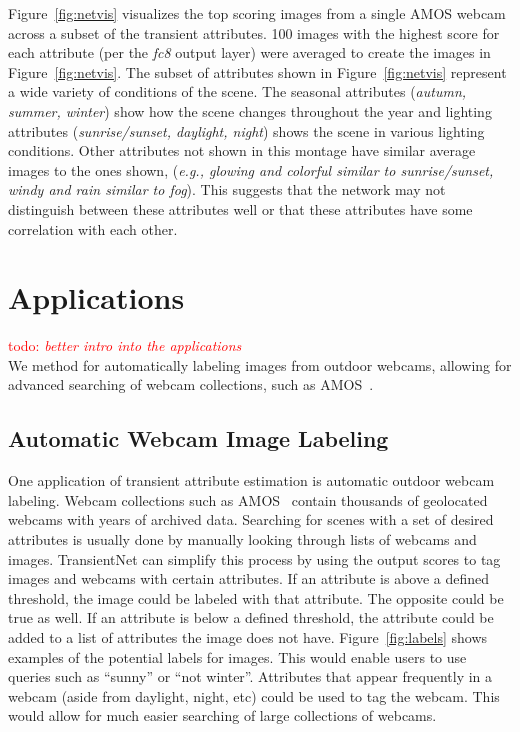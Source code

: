 \documentclass[10pt,twocolumn,letterpaper]{article}
\newcommand{\todo}[1]{\textcolor{red}{todo: {\em #1}}}
\newcommand{\figref}[1]{Figure~\ref{fig:#1}}
\begin{document}
\figref{netvis} visualizes the top scoring images from a single
AMOS webcam across a subset of the transient attributes.
100 images with the highest score for each attribute (per the \textit{fc8}
output layer) were averaged to create the images in \figref{netvis}.  The
subset of attributes shown in \figref{netvis} represent a wide variety of
conditions of the scene.  The seasonal attributes (\textit{autumn, summer,
winter}) show how the scene changes throughout the year and lighting attributes
(\textit{sunrise/sunset, daylight, night}) shows the scene in various lighting
conditions.  Other attributes not shown in this montage have similar average
images to the ones shown, (\textit{e.g., glowing and colorful similar to
sunrise/sunset, windy and rain similar to fog}).  This suggests that the
network may not distinguish between these attributes well or that these
attributes have some correlation with each other.

\section{Applications}
\todo{better intro into the applications} \\
\indent
We method for automatically labeling images from outdoor webcams, allowing for
advanced searching of webcam collections, such as AMOS~\cite{jacobs07amos}.

\subsection{Automatic Webcam Image Labeling}
\indent
One application of transient attribute estimation is automatic outdoor webcam
labeling. Webcam collections such as AMOS~\cite{jacobs07amos} contain thousands
of geolocated webcams with years of archived data.  Searching for scenes with a
set of desired attributes is usually done by manually looking through lists of
webcams and images.  TransientNet can simplify this process by using the output
scores to tag images and webcams with certain attributes.  If an attribute is
above a defined threshold, the image could be labeled with that attribute.  The
opposite could be true as well.  If an attribute is below a defined threshold,
the attribute could be added to a list of attributes the image does not have.
\figref{labels} shows examples of the potential labels for images. This would
enable users to use queries such as ``sunny'' or ``not winter''.  Attributes
that appear frequently in a webcam (aside from daylight, night, etc) could be
used to tag the webcam.  This would allow for much easier searching of large
collections of webcams.
\end{document}
